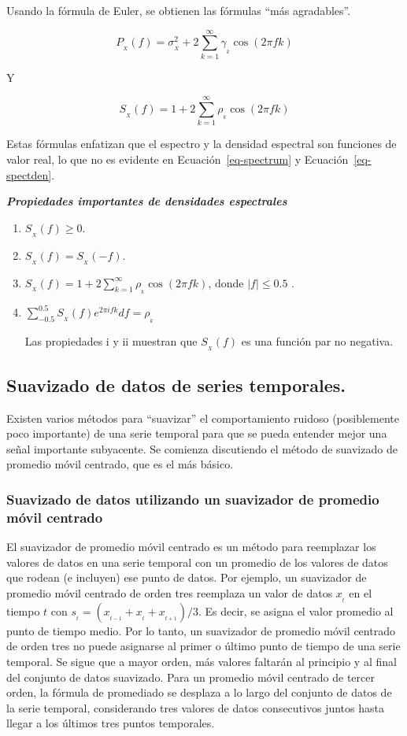 \documentclass[
  us-letterpaper,
]{scrreprt}
\theoremstyle{definition}
\theoremstyle{plain}
\theoremstyle{plain}
\theoremstyle{definition}
\theoremstyle{remark}
\begin{document}
Usando la fórmula de Euler, se obtienen las fórmulas ``más agradables''.

\[
P_{_X}(f)=\sigma_{_X}^2+2\sum_{k=1}^\infty\gamma_{_k}\cos(2\pi fk)
\]

Y

\[
S_{_X}(f)=1+2\sum_{k=1}^\infty \rho_{_k}\cos(2\pi fk)
\]

Estas fórmulas enfatizan que el espectro y la densidad espectral son
funciones de valor real, lo que no es evidente en
Ecuación~\ref{eq-spectrum} y Ecuación~\ref{eq-spectden}.

\textbf{\emph{Propiedades importantes de densidades espectrales}}

\begin{enumerate}
\def\labelenumi{\roman{enumi}.}
\item
  \(S_{_X}(f)\geq 0\).
\item
  \(S_{_X}(f)=S_{_X}(-f)\).
\item
  \(S_{_X}(f)=1+2\sum\limits_{k=1}^\infty \rho_{_k}\cos(2\pi fk)\),
  donde \(|f|\le 0.5\) .
\item
  \(\sum\limits_{-0.5}^{0.5}S_{_X}(f)e^{2\pi ifk}df=\rho_{_k}\)

  Las propiedades i y ii muestran que \(S_{_X}(f)\) es una función par
  no negativa.
\end{enumerate}

\subsection{Suavizado de datos de series
temporales.}\label{suavizado-de-datos-de-series-temporales.}

Existen varios métodos para ``suavizar'' el comportamiento ruidoso
(posiblemente poco importante) de una serie temporal para que se pueda
entender mejor una señal importante subyacente. Se comienza discutiendo
el método de suavizado de promedio móvil centrado, que es el más básico.

\subsubsection{Suavizado de datos utilizando un suavizador de promedio
móvil centrado}\label{sec-mas}

El suavizador de promedio móvil centrado es un método para reemplazar
los valores de datos en una serie temporal con un promedio de los
valores de datos que rodean (e incluyen) ese punto de datos. Por
ejemplo, un suavizador de promedio móvil centrado de orden tres
reemplaza un valor de datos \(x_{_t}\) en el tiempo \(t\) con
\(s_{_t} = (x_{_{t-1}}+x_{_t}+x_{_{t+1}})/3\). Es decir, se asigna el
valor promedio al punto de tiempo medio. Por lo tanto, un suavizador de
promedio móvil centrado de orden tres no puede asignarse al primer o
último punto de tiempo de una serie temporal. Se sigue que a mayor
orden, más valores faltarán al principio y al final del conjunto de
datos suavizado. Para un promedio móvil centrado de tercer orden, la
fórmula de promediado se desplaza a lo largo del conjunto de datos de la
serie temporal, considerando tres valores de datos consecutivos juntos
hasta llegar a los últimos tres puntos temporales.
\end{document}
